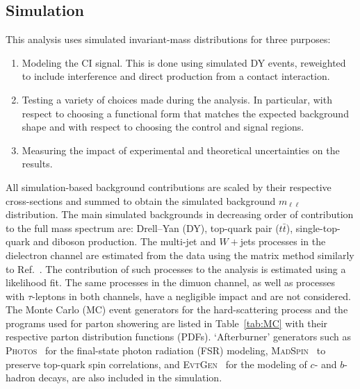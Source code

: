 \subsection{Simulation}

This analysis uses simulated invariant-mass distributions for three purposes:
\begin{enumerate}
    \item Modeling the CI signal. This is done using simulated DY events, reweighted to include interference and direct production from a contact interaction.
    \item Testing a variety of choices made during the analysis. In particular, with respect to choosing a functional form that matches the expected background shape and with respect to choosing the control and signal regions.
    \item Measuring the impact of experimental and theoretical uncertainties on the results.
\end{enumerate}

All simulation-based background contributions are scaled by their respective cross-sections and summed to obtain the simulated background $m_{\ell\ell}$ distribution.
The main simulated backgrounds in decreasing order of contribution to the full mass spectrum are: Drell--Yan (DY), top-quark pair ($t\bar{t}$), single-top-quark and diboson production.
The multi-jet and $W+$jets processes in the dielectron channel are estimated from the data using the matrix method similarly to Ref.~\cite{EXOT-2016-05}. The contribution of such processes to the analysis is estimated using a likelihood fit.
The same processes in the dimuon channel, as well as processes with $\tau$-leptons in both channels, have a negligible impact and are not considered.
The Monte Carlo (MC) event generators for the hard-scattering process and the programs used for parton showering are listed in Table~\ref{tab:MC} with their respective parton distribution functions (PDFs).
`Afterburner' generators such as \textsc{Photos}~\cite{Golonka:2005pn} for the final-state photon radiation (FSR) modeling, \textsc{MadSpin}~\cite{Artoisenet:2012st} to preserve top-quark spin correlations, and \textsc{EvtGen}~\cite{Lange:2001uf} for the modeling of $c$- and $b$-hadron decays, are also included in the simulation.

